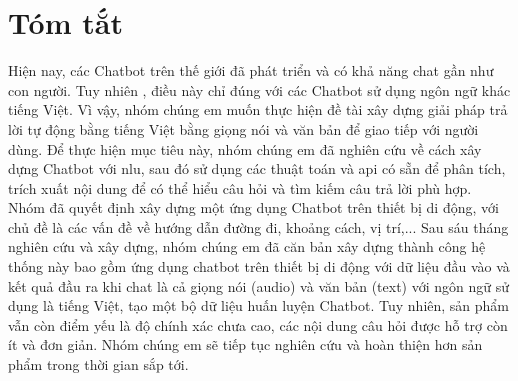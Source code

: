 \chapter*{Tóm tắt}
\label{tomtat}
Hiện nay, các Chatbot trên thế giới đã phát triển và có khả năng chat gần như con người. Tuy nhiên , điều này chỉ đúng với các Chatbot sử dụng ngôn ngữ khác tiếng Việt. Vì vậy, nhóm chúng em muốn thực hiện đề tài xây dựng giải pháp trả lời tự động bằng tiếng Việt bằng giọng nói và văn bản để giao tiếp với người dùng. Để thực hiện mục tiêu này, nhóm chúng em đã nghiên cứu về cách xây dựng Chatbot với \ac{nlu}, sau đó sử dụng các thuật toán và \ac{api} có sẵn để phân tích, trích xuất nội dung để có thể hiểu câu hỏi và tìm kiếm câu trả lời phù hợp. Nhóm đã quyết định xây dựng một ứng dụng Chatbot trên thiết bị di động, với chủ đề là các vấn đề về hướng dẫn đường đi, khoảng cách, vị trí,... Sau sáu tháng nghiên cứu và xây dựng, nhóm chúng em đã căn bản xây dựng thành công hệ thống này bao gồm ứng dụng chatbot trên thiết bị di động với dữ liệu đầu vào và kết quả đầu ra khi chat là cả giọng nói (audio) và văn bản (text) với ngôn ngữ sử dụng là tiếng Việt, tạo một bộ dữ liệu huấn luyện Chatbot. Tuy nhiên, sản phẩm vẫn còn điểm yếu là độ chính xác chưa cao, các nội dung câu hỏi được hỗ trợ còn ít và đơn giản. Nhóm chúng em sẽ tiếp tục nghiên cứu và hoàn thiện hơn sản phẩm trong thời gian sắp tới. 

